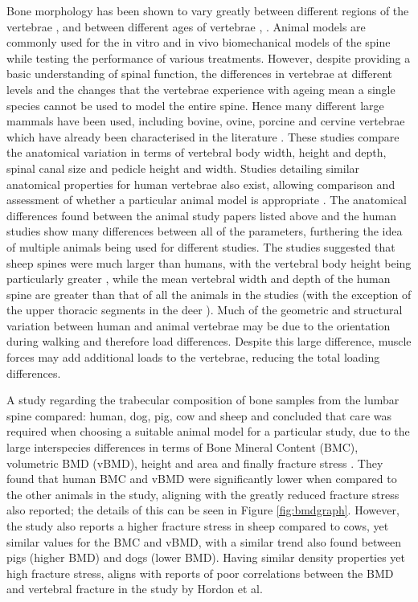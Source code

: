 Bone morphology has been shown to vary greatly between different regions
of the vertebrae \cite{hulme2007regional}, \cite{thomsen2002zone} and between
different ages
of
vertebrae \cite{thomsen2002zone}, \cite{ebbesen1999age}. Animal models are
commonly used for
the in
vitro and in vivo biomechanical models of the spine while testing the
performance of various treatments. However, despite providing a basic
understanding of spinal function, the differences in vertebrae at
different levels and the changes that the vertebrae experience with ageing
mean a single species cannot be used to model the entire spine. Hence
many different large mammals have been used, including bovine, ovine,
porcine and cervine vertebrae which have already been characterised in
the literature \cite{wilke1997sheep,kandziora2001comparison,kumar2000anatomy}. These studies
compare the
anatomical
variation in terms of vertebral body width, height and depth, spinal
canal size and pedicle height and width. Studies detailing similar
anatomical properties for human vertebrae also exist, allowing
comparison and assessment of whether a particular animal model is
appropriate \cite{panjabi1991cervical,Manohar1992}. The
anatomical differences found
between
the animal study papers listed above and the human studies show many
differences between all of the parameters, furthering the idea of
multiple animals being used for different studies. The studies suggested
that sheep spines were much larger than humans, with the vertebral body
height being particularly greater \cite{kumar2000anatomy,kandziora2001comparison}, while the
mean
vertebral width and depth of the human spine are greater than that of
all the animals in the studies (with the exception of the upper thoracic
segments in the deer \cite{kumar2000anatomy}). Much of the geometric and structural variation between human and animal vertebrae may be due to the orientation during walking and therefore load differences. Despite this large difference, muscle forces may add additional loads to the vertebrae, reducing the total loading differences.

A study regarding the trabecular composition of bone samples from the
lumbar spine compared: human, dog, pig, cow and sheep and concluded that
care was required when choosing a suitable animal model for a particular
study, due to the large interspecies differences in terms of Bone Mineral Content (BMC),
volumetric BMD (vBMD), height and area and finally fracture stress
\cite{aerssens1998interspecies}. They found that human BMC and vBMD were
significantly lower
when compared to the other animals in the study, aligning with the
greatly reduced fracture stress also reported; the details of this can
be seen in Figure \ref{fig:bmdgraph}. However, the study also reports a
higher fracture
stress in sheep compared to cows, yet similar values for the BMC and
vBMD, with a similar trend also found between pigs (higher BMD) and dogs
(lower BMD). Having similar density properties yet high fracture stress,
aligns with reports of poor correlations between the BMD and vertebral
fracture in the study by Hordon et al\cite{Aaron2000}.



